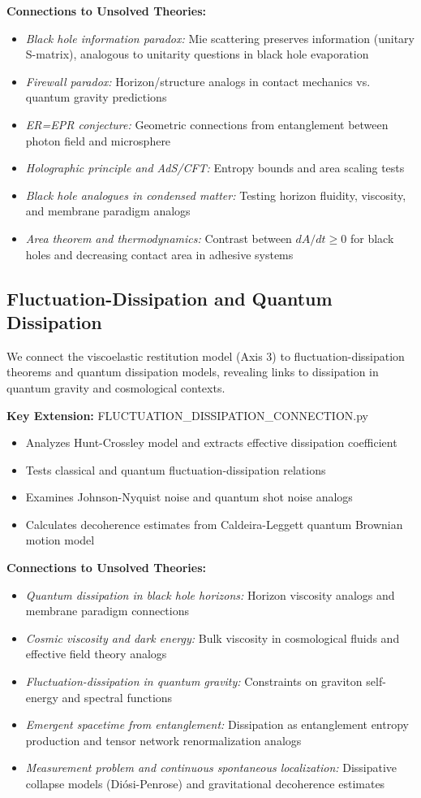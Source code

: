 \documentclass[12pt,twoside]{article}
\begin{document}
\textbf{Connections to Unsolved Theories:}
\begin{itemize}
\item \textit{Black hole information paradox:} Mie scattering preserves information (unitary S-matrix), analogous to unitarity questions in black hole evaporation
\item \textit{Firewall paradox:} Horizon/structure analogs in contact mechanics vs. quantum gravity predictions
\item \textit{ER=EPR conjecture:} Geometric connections from entanglement between photon field and microsphere
\item \textit{Holographic principle and AdS/CFT:} Entropy bounds and area scaling tests
\item \textit{Black hole analogues in condensed matter:} Testing horizon fluidity, viscosity, and membrane paradigm analogs
\item \textit{Area theorem and thermodynamics:} Contrast between $dA/dt \geq 0$ for black holes and decreasing contact area in adhesive systems
\end{itemize}

\subsection{Fluctuation-Dissipation and Quantum Dissipation}
We connect the viscoelastic restitution model (Axis 3) to fluctuation-dissipation theorems and quantum dissipation models, revealing links to dissipation in quantum gravity and cosmological contexts.

\textbf{Key Extension:} FLUCTUATION\_DISSIPATION\_CONNECTION.py
\begin{itemize}
\item Analyzes Hunt-Crossley model and extracts effective dissipation coefficient
\item Tests classical and quantum fluctuation-dissipation relations
\item Examines Johnson-Nyquist noise and quantum shot noise analogs
\item Calculates decoherence estimates from Caldeira-Leggett quantum Brownian motion model
\end{itemize}

\textbf{Connections to Unsolved Theories:}
\begin{itemize}
\item \textit{Quantum dissipation in black hole horizons:} Horizon viscosity analogs and membrane paradigm connections
\item \textit{Cosmic viscosity and dark energy:} Bulk viscosity in cosmological fluids and effective field theory analogs
\item \textit{Fluctuation-dissipation in quantum gravity:} Constraints on graviton self-energy and spectral functions
\item \textit{Emergent spacetime from entanglement:} Dissipation as entanglement entropy production and tensor network renormalization analogs
\item \textit{Measurement problem and continuous spontaneous localization:} Dissipative collapse models (Diósi-Penrose) and gravitational decoherence estimates
\end{itemize}
\end{document}
